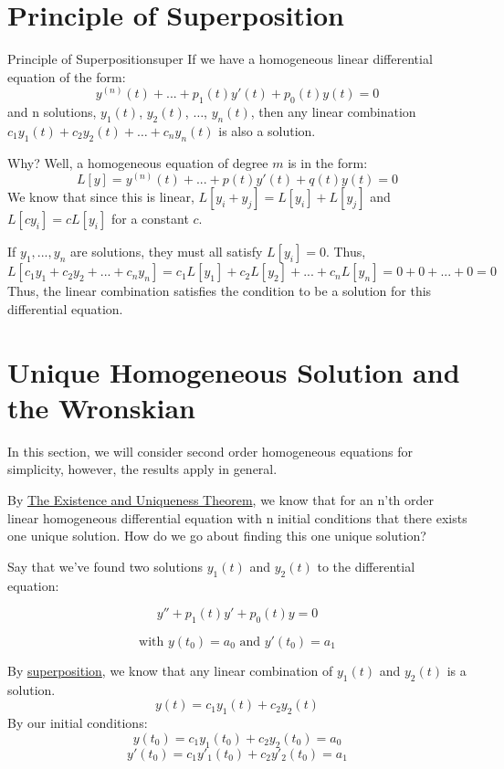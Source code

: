 \documentclass{report}
\begin{document}
\section{Principle of Superposition}

\begin{mytheo}{Principle of Superposition}{super}
 If we have a homogeneous linear differential equation of the form:
 $$y^{(n)}(t) + ... + p_1(t)y'(t) + p_0(t)y(t) = 0$$
 and n solutions, $y_1(t)$, $y_2(t)$, $\dots$, $y_n(t)$, then any linear combination $c_1y_1(t) + c_2y_2(t) + \dots + c_ny_n(t)$ is also a solution.
\end{mytheo}


Why?
Well, a homogeneous equation of degree $m$ is in the form:
$$L[y] = y^{(n)}(t) + ... + p(t)y'(t) + q(t)y(t) = 0$$
We know that since this is linear, $L[y_i+y_j] = L[y_i] + L[y_j]$ and $L[cy_i] = cL[y_i]$ for a constant $c$.

If $y_1, ..., y_n$ are solutions, they must all satisfy $L[y_i] = 0$. Thus,
$$L[c_1y_1+c_2y_2+...+c_ny_n] = c_1L[y_1] + c_2L[y_2] + ... + c_nL[y_n] = 0 + 0 + ... + 0 = 0$$
Thus, the linear combination satisfies the condition to be a solution for this differential equation.



\section{Unique Homogeneous Solution and the Wronskian}
In this section, we will consider second order homogeneous equations for simplicity, however, the results apply in general.

By \hyperref[th:Ex&Un]{The Existence and Uniqueness Theorem}, we know that for an n'th order linear homogeneous differential equation with n initial conditions that there exists one unique solution. How do we go about finding this one unique solution?

Say that we've found two solutions $y_1(t)$ and $y_2(t)$ to the differential equation:

$$y'' + p_1(t)y' + p_0(t)y = 0$$

$$\text{with } y(t_0) = a_0 \text{ and } y'(t_0) = a_1$$

By \hyperref[th:super]{superposition}, we know that any linear combination of $y_1(t)$ and $y_2(t)$ is a solution.
$$y(t) = c_1y_1(t) + c_2y_2(t)$$
By our initial conditions:
$$y(t_0) = c_1y_1(t_0) + c_2y_2(t_0) = a_0$$
$$y'(t_0) = c_1y'_1(t_0) + c_2y'_2(t_0) = a_1$$
\end{document}
